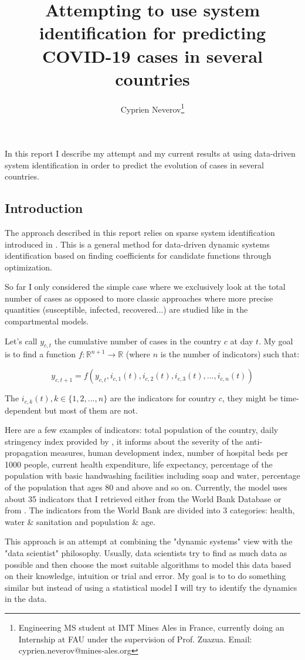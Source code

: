 \documentclass[12pt, a4]{article}
\title{Attempting to use system identification for predicting COVID-19 cases in several countries}
\author{Cyprien Neverov\footnote{Engineering MS student at IMT Mines Ales in France, currently doing an Internship at FAU under the supervision of Prof. Zuazua. Email: cyprien.neverov@mines-ales.org}}
\begin{document}
\maketitle

In this report I describe my attempt and my current results at using data-driven system identification in order to predict the evolution of cases in several countries.

\subsection*{Introduction}

The approach described in this report relies on sparse system identification introduced in \cite{Brunton3932}. 
This is a general method for data-driven dynamic systems identification based on finding coefficients for candidate functions through optimization.


So far I only considered the simple case where we exclusively look at the total number of cases as opposed to more classic approaches where more precise quantities (susceptible, infected, recovered...) are studied like in the compartmental models. 

Let's call $y_{c,t}$ the cumulative number of cases in the country $c$ at day $t$. 
My goal is to find a function $f: \mathbb{R}^{n+1} \to \mathbb{R}$ (where $n$ is the number of indicators) such that:

$$y_{c, t+1} = f(y_{c, t}, i_{c, 1}(t), i_{c, 2}(t), i_{c, 3}(t), ... , i_{c, n}(t))$$ 

The $i_{c, k}(t), k \in \{1, 2, ..., n\}$ are the indicators for country $c$, they might be time-dependent but most of them are not. 

Here are a few examples of indicators: total population of the country, daily stringency index provided by \cite{stringency}, it informs about the severity of the anti-propagation measures, human development index, number of hospital beds per 1000 people, current health expenditure, life expectancy, percentage of the population with basic handwashing facilities including soap and water, percentage of the population that ages 80 and above and so on.
Currently, the model uses about 35 indicators that I retrieved either from the World Bank Database \cite{indicators} or from \cite{stringency}.
The indicators from the World Bank are divided into 3 categories: health, water \& sanitation and population \& age.

This approach is an attempt at combining the "dynamic systems" view with the "data scientist" philosophy. 
Usually, data scientists try to find as much data as possible and then choose the most suitable algorithms to model this data based on their knowledge, intuition or trial and error. My goal is to to do something similar but instead of using a statistical model I will try to identify the dynamics in the data.
\end{document}
